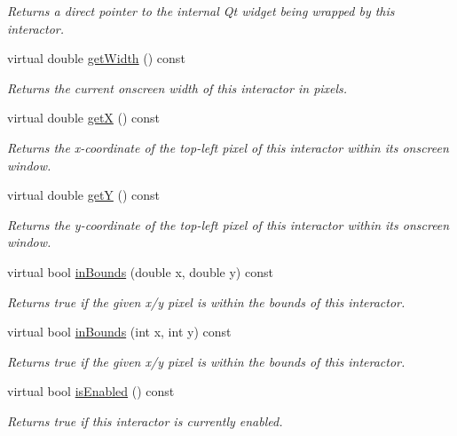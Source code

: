 \begin{DoxyCompactItemize}
\begin{DoxyCompactList}\small\item\em Returns a direct pointer to the internal Qt widget being wrapped by this interactor. \end{DoxyCompactList}\item 
virtual double \mbox{\hyperlink{classGInteractor_a0ed2965abd4f5701d2cadf71239faf19}{get\+Width}} () const
\begin{DoxyCompactList}\small\item\em Returns the current onscreen width of this interactor in pixels. \end{DoxyCompactList}\item 
virtual double \mbox{\hyperlink{classGInteractor_a344385751bee0720059403940d57a13e}{getX}} () const
\begin{DoxyCompactList}\small\item\em Returns the x-\/coordinate of the top-\/left pixel of this interactor within its onscreen window. \end{DoxyCompactList}\item 
virtual double \mbox{\hyperlink{classGInteractor_aafa51c7f8f38a09febbb9ce7853f77b4}{getY}} () const
\begin{DoxyCompactList}\small\item\em Returns the y-\/coordinate of the top-\/left pixel of this interactor within its onscreen window. \end{DoxyCompactList}\item 
virtual bool \mbox{\hyperlink{classGInteractor_afc480f652b8c5f1fb255e2269ce68879}{in\+Bounds}} (double x, double y) const
\begin{DoxyCompactList}\small\item\em Returns true if the given x/y pixel is within the bounds of this interactor. \end{DoxyCompactList}\item 
virtual bool \mbox{\hyperlink{classGInteractor_ae6d7982c1c627b677a5e776ca86118ed}{in\+Bounds}} (int x, int y) const
\begin{DoxyCompactList}\small\item\em Returns true if the given x/y pixel is within the bounds of this interactor. \end{DoxyCompactList}\item 
virtual bool \mbox{\hyperlink{classGInteractor_aacb819fb241851fd9fc045271baa4034}{is\+Enabled}} () const
\begin{DoxyCompactList}\small\item\em Returns true if this interactor is currently enabled. \end{DoxyCompactList}\item 

\end{DoxyCompactItemize}

